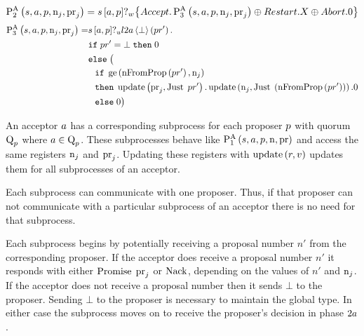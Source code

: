 \begin{align*}
\operatorname{P^{A}_{2}}\left(
    s,
    a,
    p,
    \operatorname{n}_{j},
    \operatorname{pr}_{j}
\right) =
    s\left[a, p\right]?_w \big\{
    \mathnormal{Accept}.
        \operatorname{P^{A}_{3}}\left(
            s,
            a,
            p,
            \operatorname{n}_{j},
            \operatorname{pr}_{j}
        \right)
    \oplus \mathnormal{Restart}.X
    \oplus \mathnormal{Abort}.0
\big\}
\end{align*}
\begin{align*}
\operatorname{P^{A}_{3}}\left(
    s,
    a,
    p,
    \operatorname{n}_{j},
    \operatorname{pr}_{j}
\right) =
&
    s\left[a, p\right]?_u l2a \left\langle \bot \right\rangle \left(pr'\right).\\
&
    \mathtt{if}\; pr' = \bot \;\mathtt{then}\; 0\\
&
    \mathtt{else}\;
\big(
    \\
&\hspace*{0.75em * 1}
    \mathtt{if}\; \operatorname{ge}\left(\operatorname{nFromProp}\left(pr' \right), \operatorname{n}_{j}\right)\\
&\hspace*{0.75em * 1}
    \mathtt{then}\;
        \operatorname{update} \left(\operatorname{pr}_{j}, \operatorname{Just}\; pr'\right).
        \operatorname{update} \left(\operatorname{n}_{j}, \operatorname{Just}\; \left(\operatorname{nFromProp}\left(pr' \right)\right)\right).
        0\\
&\hspace*{0.75em * 1}
    \mathtt{else}\; 0
\big)
\end{align*}

An acceptor $a$ has a corresponding subprocess for each proposer $p$ with quorum $\operatorname{Q}_{p}$ where $a\in\operatorname{Q}_{p}$.
These subprocesses behave like $\operatorname{P^{A}_{1}}\left(
    s,
    a,
    p,
    \operatorname{n},
    \operatorname{pr}
\right)$ and access the same registers $\operatorname{n}_{j}$ and $\operatorname{pr}_{j}$.
Updating these registers with $\operatorname{update} \left(r, v\right)$ updates them for all subprocesses of an acceptor.

Each subprocess can communicate with one proposer.
Thus, if that proposer can not communicate with a particular subprocess of an acceptor there is no need for that subprocess.

Each subprocess begins by potentially receiving a proposal number $n'$ from the corresponding proposer.
If the acceptor does receive a proposal number $n'$ it responds with either $\operatorname{Promise}\; \operatorname{pr}_{j}$ or $\operatorname{Nack}$, depending on the values of $n'$ and $\operatorname{n}_{j}$.
If the acceptor does not receive a proposal number then it sends $\bot$ to the proposer.
Sending $\bot$ to the proposer is necessary to maintain the global type.
In either case the subprocess moves on to receive the proposer's decision in phase $2a$.

